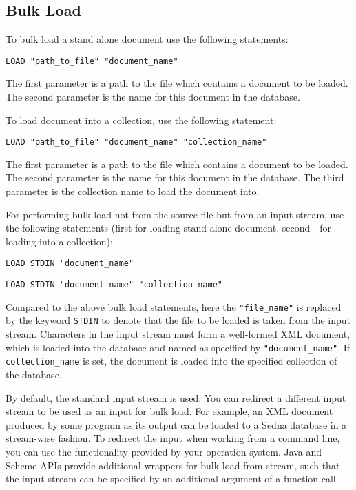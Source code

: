 \documentclass[a4paper,12pt]{article}
\begin{document}
\subsection{Bulk Load}
\label{bulk-load}

To bulk load a stand alone document use the following statements:
\begin{verbatim}
LOAD "path_to_file" "document_name"
\end{verbatim}
The first parameter is a path to the file which contains a document to be
loaded. The second parameter is the name for this document in the database.

To load document into a collection, use the following statement:
\begin{verbatim}
LOAD "path_to_file" "document_name" "collection_name"
\end{verbatim}
The first parameter is a path to the file which contains a document to be
loaded. The second parameter is the name for this document in the database. The
third parameter is the collection name to load the document into.

For performing bulk load not from the source file but from an input stream,
use the following statements (first for loading stand alone document, second -
for loading into a collection):
\begin{verbatim}
LOAD STDIN "document_name"
\end{verbatim}
\begin{verbatim}
LOAD STDIN "document_name" "collection_name"
\end{verbatim}

Compared to the above bulk load statements, here the \verb!"file_name"! is
replaced by the keyword \verb!STDIN! to denote that the file to be loaded is
taken from the input stream. Characters in the input stream must form a
well-formed XML document, which is loaded into the database and named as
specified by \verb!"document_name"!. If \verb!collection_name! is set, the
document is loaded into the specified collection of the database.

By default, the standard input stream is used. You can redirect a different
input stream to be used as an input for bulk load. For example, an XML document
produced by some program as its output can be loaded to a Sedna database in a
stream-wise fashion. To redirect the input when working from a command line, you
can use the functionality provided by your operation system. Java and Scheme
APIs provide additional wrappers for bulk load from stream, such that the input
stream can be specified by an additional argument of a function call.
\end{document}
